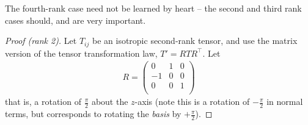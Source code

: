 \documentclass{../template/note}
\begin{document}
    The fourth-rank case need not be learned by heart -- the second and third rank cases should, and are very important.

    \begin{proof}[Proof (rank 2)]
        Let \(T_{ij}\) be an isotropic second-rank tensor, and use the matrix version of the tensor transformation law, \(T' = RTR^\intercal\). Let
        \begin{align*}
            R = \begin{pmatrix}
                0 & 1 & 0 \\
                -1 & 0 & 0 \\
                0 & 0 & 1 \\
            \end{pmatrix}
        \end{align*}
        that is, a rotation of \(\frac{\pi}2\) about the \(z\)-axis (note this is a rotation of \(-\frac{\pi}2\) in normal terms, but corresponds to rotating the \emph{basis} by \(+\frac{\pi}2\)).
    


\end{proof}
\end{document}
